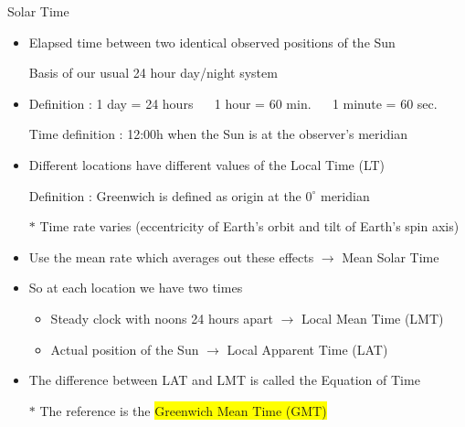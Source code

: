 \begin{center}
{\red Solar Time}
\end{center}
%
\begin{itemize}
\item {\blue Elapsed time between two identical observed positions of the Sun}
\item[] Basis of our usual 24 hour day/night system
\item Definition : 1 day = 24 hours $\quad$ 1 hour = 60 min. $\quad$ 1 minute = 60 sec.
\item[] Time definition : 12:00h when the Sun is at the observer's meridian
\item Different locations have different values of the {\blue Local Time (LT)}
\item[] Definition : {\blue Greenwich is defined as origin at the $0^{\circ}$ meridian}
\item[$\ast$] Time rate varies (eccentricity of Earth's orbit and tilt of Earth's spin axis)
\item Use the mean rate which averages out these effects $\rightarrow$ {\blue Mean Solar Time}
\item So at each location we have two times
\begin{itemize}
\item Steady clock with noons 24 hours apart $\rightarrow$ {\blue Local Mean Time (LMT)}
\item Actual position of the Sun $\rightarrow$ {\blue Local Apparent Time (LAT)}
\end{itemize}
\item The difference between LAT and LMT is called the {\blue Equation of Time}
\item[$\ast$] The reference is the \colorbox{yellow}{Greenwich Mean Time (GMT)} 
\end{itemize}

